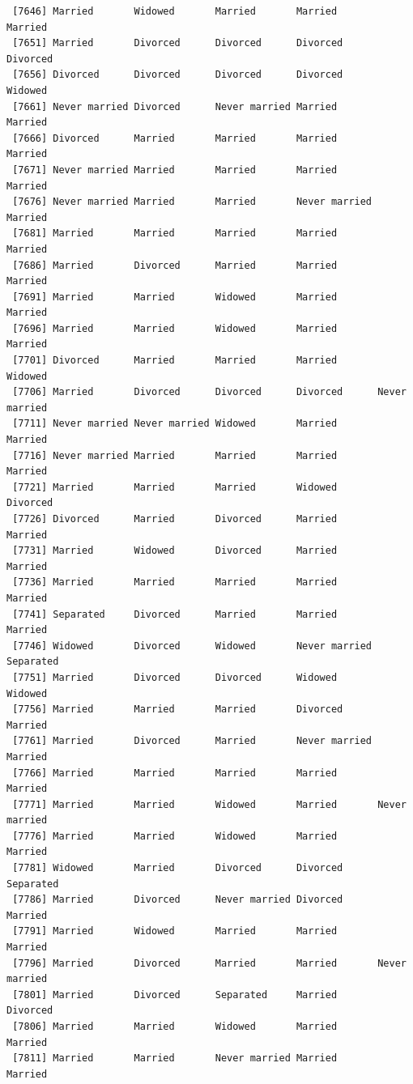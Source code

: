 \documentclass[
  letterpaper,
  DIV=11,
  numbers=noendperiod,
  oneside]{scrartcl}
\begin{document}
\begin{verbatim}
 [7646] Married       Widowed       Married       Married       Married      
 [7651] Married       Divorced      Divorced      Divorced      Divorced     
 [7656] Divorced      Divorced      Divorced      Divorced      Widowed      
 [7661] Never married Divorced      Never married Married       Married      
 [7666] Divorced      Married       Married       Married       Married      
 [7671] Never married Married       Married       Married       Married      
 [7676] Never married Married       Married       Never married Married      
 [7681] Married       Married       Married       Married       Married      
 [7686] Married       Divorced      Married       Married       Married      
 [7691] Married       Married       Widowed       Married       Married      
 [7696] Married       Married       Widowed       Married       Married      
 [7701] Divorced      Married       Married       Married       Widowed      
 [7706] Married       Divorced      Divorced      Divorced      Never married
 [7711] Never married Never married Widowed       Married       Married      
 [7716] Never married Married       Married       Married       Married      
 [7721] Married       Married       Married       Widowed       Divorced     
 [7726] Divorced      Married       Divorced      Married       Married      
 [7731] Married       Widowed       Divorced      Married       Married      
 [7736] Married       Married       Married       Married       Married      
 [7741] Separated     Divorced      Married       Married       Married      
 [7746] Widowed       Divorced      Widowed       Never married Separated    
 [7751] Married       Divorced      Divorced      Widowed       Widowed      
 [7756] Married       Married       Married       Divorced      Married      
 [7761] Married       Divorced      Married       Never married Married      
 [7766] Married       Married       Married       Married       Married      
 [7771] Married       Married       Widowed       Married       Never married
 [7776] Married       Married       Widowed       Married       Married      
 [7781] Widowed       Married       Divorced      Divorced      Separated    
 [7786] Married       Divorced      Never married Divorced      Married      
 [7791] Married       Widowed       Married       Married       Married      
 [7796] Married       Divorced      Married       Married       Never married
 [7801] Married       Divorced      Separated     Married       Divorced     
 [7806] Married       Married       Widowed       Married       Married      
 [7811] Married       Married       Never married Married       Married      

\end{verbatim}
\end{document}
